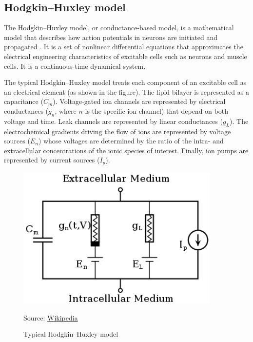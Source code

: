 \documentclass[paper=a4, fontsize=11pt]{scrartcl} %
\numberwithin{equation}{section} %
\numberwithin{figure}{section} %
\numberwithin{table}{section} %
\begin{document}
\subsection{Hodgkin–Huxley model}
The Hodgkin–Huxley model, or conductance-based model, is a mathematical model that describes how action potentials in neurons are initiated and propagated \cite{A.L.Hodgkin1952QuantitativeDescriptionMembrane}. It is a set of nonlinear differential equations that approximates the electrical engineering characteristics of excitable cells such as neurons and muscle cells. It is a continuous-time dynamical system.

\vspace{10pt}
The typical Hodgkin–Huxley model treats each component of an excitable cell as an electrical element (as shown in the figure). The lipid bilayer is represented as a capacitance (\(C_m\)). Voltage-gated ion channels are represented by electrical conductances (\(g_n\), where \(n\) is the specific ion channel) that depend on both voltage and time. Leak channels are represented by linear conductances (\(g_L\)). The electrochemical gradients driving the flow of ions are represented by voltage sources (\(E_n\)) whose voltages are determined by the ratio of the intra- and extracellular concentrations of the ionic species of interest. Finally, ion pumps are represented by current sources (\(I_p\)).

\begin{figure}[h]
    \centering
    \includegraphics[width=0.9\textwidth]{./data/Hodgkin-Huxley.png}
    \caption{Typical Hodgkin–Huxley model}
    \label{fig:my_picture}
    \vspace{1pt} %
    \small{Source: \href{https://en.wikipedia.org/wiki/Hodgkin%E2%80%93Huxley_model}{Wikipedia}}
\end{figure}
\end{document}
